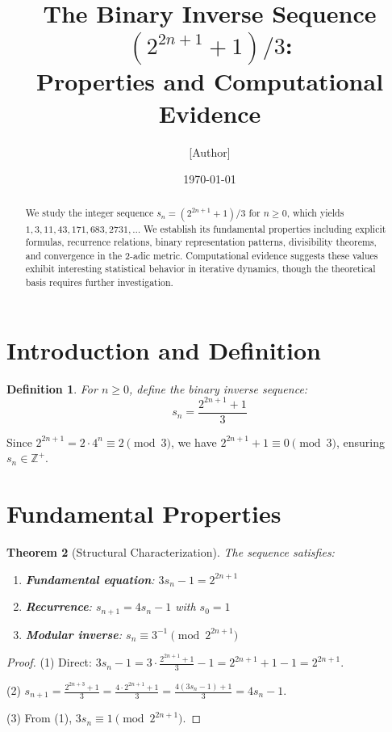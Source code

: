 \documentclass[11pt]{article}
\title{The Binary Inverse Sequence $(2^{2n+1} + 1)/3$: \\Properties and Computational Evidence}
\author{[Author]}
\date{\today}
\newtheorem{theorem}{Theorem}
\newtheorem{definition}[theorem]{Definition}
\theoremstyle{remark}
\begin{document}
\maketitle

\begin{abstract}
We study the integer sequence $s_n = (2^{2n+1} + 1)/3$ for $n \geq 0$, which yields $1, 3, 11, 43, 171, 683, 2731, \ldots$ We establish its fundamental properties including explicit formulas, recurrence relations, binary representation patterns, divisibility theorems, and convergence in the $2$-adic metric. Computational evidence suggests these values exhibit interesting statistical behavior in iterative dynamics, though the theoretical basis requires further investigation.
\end{abstract}

\section{Introduction and Definition}

\begin{definition}
For $n \geq 0$, define the \emph{binary inverse sequence}:
\[s_n = \frac{2^{2n+1} + 1}{3}\]
\end{definition}

Since $2^{2n+1} = 2 \cdot 4^n \equiv 2 \pmod{3}$, we have $2^{2n+1} + 1 \equiv 0 \pmod{3}$, ensuring $s_n \in \mathbb{Z}^+$.

\section{Fundamental Properties}

\begin{theorem}[Structural Characterization]
The sequence satisfies:
\begin{enumerate}
\item \textbf{Fundamental equation}: $3s_n - 1 = 2^{2n+1}$
\item \textbf{Recurrence}: $s_{n+1} = 4s_n - 1$ with $s_0 = 1$
\item \textbf{Modular inverse}: $s_n \equiv 3^{-1} \pmod{2^{2n+1}}$
\end{enumerate}
\end{theorem}

\begin{proof}
(1) Direct: $3s_n - 1 = 3 \cdot \frac{2^{2n+1} + 1}{3} - 1 = 2^{2n+1} + 1 - 1 = 2^{2n+1}$.

(2) $s_{n+1} = \frac{2^{2n+3} + 1}{3} = \frac{4 \cdot 2^{2n+1} + 1}{3} = \frac{4(3s_n - 1) + 1}{3} = 4s_n - 1$.

(3) From (1), $3s_n \equiv 1 \pmod{2^{2n+1}}$.
\end{proof}
\end{document}
